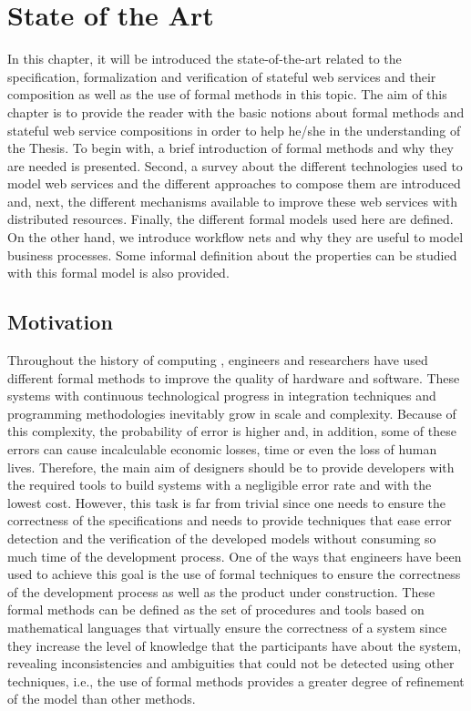 \chapter{State of the Art}\label{chapter:c2}
In this chapter, it will be introduced the state-of-the-art 
related to the specification, formalization and verification
of stateful web services and their composition as well as the use of formal methods in this topic. The aim of this chapter is to provide the reader
with the basic notions about formal methods and stateful web service compositions in order to help he/she in the understanding
of the Thesis. To begin with, a brief introduction of formal methods 
and why they are needed is presented. Second, a survey about the different technologies used to model web services
and the different approaches to compose them are introduced and,
next, the different mechanisms available to improve
these web services with distributed resources. 
Finally, the different formal models used here are defined. 
On the other hand, we introduce workflow nets
and why they are useful to model business processes. 
Some informal definition about the properties can be studied with this formal model is also provided. 

\section{Motivation}

Throughout the history of computing , engineers and researchers have used different formal methods to improve the quality of hardware and software. These systems with continuous technological progress in integration techniques and programming methodologies inevitably grow in scale and complexity. Because of this complexity, the probability of error is higher and, in addition, some of these errors can cause incalculable economic losses, time or even the loss of human lives. Therefore, the main aim of designers should be to provide developers with the required tools to build systems with a negligible error rate and with the lowest cost. However, this task is far from trivial since one needs to ensure the correctness of the specifications and needs to provide techniques that ease error detection and the verification of the developed models without consuming so much time of the development process. One of the ways that engineers have been used to achieve this goal is the use of formal techniques to ensure the correctness of the development process as well as the product under construction. These formal methods can be defined as the set of procedures and tools based on mathematical languages that virtually ensure the correctness of a system \cite{Clarke96} since they increase the level of knowledge that the participants have about the system, revealing inconsistencies and ambiguities that could not be detected using other techniques, i.e., the use of formal methods provides a greater degree of refinement of the model than other methods.


